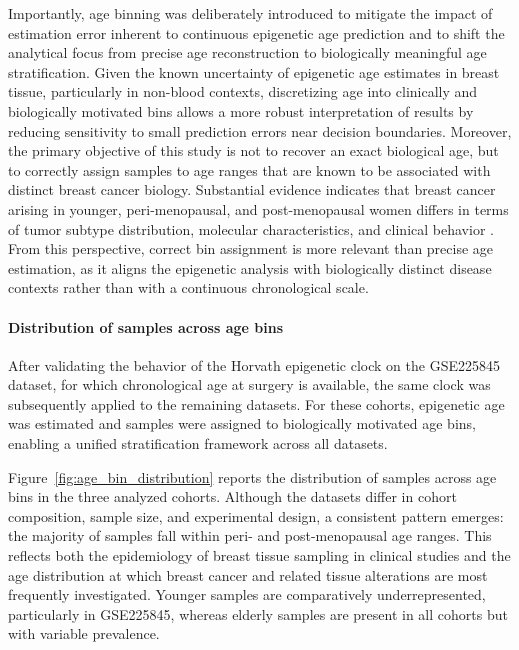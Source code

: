 \documentclass[10pt]{extarticle}
\begin{document}
Importantly, age binning was deliberately introduced to mitigate the impact of estimation error inherent to continuous epigenetic age prediction and to shift the analytical focus from precise age reconstruction to biologically meaningful age stratification. Given the known uncertainty of epigenetic age estimates in breast tissue, particularly in non-blood contexts, discretizing age into clinically and biologically motivated bins allows a more robust interpretation of results by reducing sensitivity to small prediction errors near decision boundaries.
Moreover, the primary objective of this study is not to recover an exact biological age, but to correctly assign samples to age ranges that are known to be associated with distinct breast cancer biology. Substantial evidence indicates that breast cancer arising in younger, peri-menopausal, and post-menopausal women differs in terms of tumor subtype distribution, molecular characteristics, and clinical behavior \cite{Azim2012}. From this perspective, correct bin assignment is more relevant than precise age estimation, as it aligns the epigenetic analysis with biologically distinct disease contexts rather than with a continuous chronological scale.

\paragraph{Distribution of samples across age bins}
After validating the behavior of the Horvath epigenetic clock on the GSE225845 dataset, for which chronological age at surgery is available, the same clock was subsequently applied to the remaining datasets. For these cohorts, epigenetic age was estimated and samples were assigned to biologically motivated age bins, enabling a unified stratification framework across all datasets.

Figure~\ref{fig:age_bin_distribution} reports the distribution of samples across age bins in the three analyzed cohorts. Although the datasets differ in cohort composition, sample size, and experimental design, a consistent pattern emerges: the majority of samples fall within peri- and post-menopausal age ranges. This reflects both the epidemiology of breast tissue sampling in clinical studies and the age distribution at which breast cancer and related tissue alterations are most frequently investigated. Younger samples are comparatively underrepresented, particularly in GSE225845, whereas elderly samples are present in all cohorts but with variable prevalence.
\end{document}
